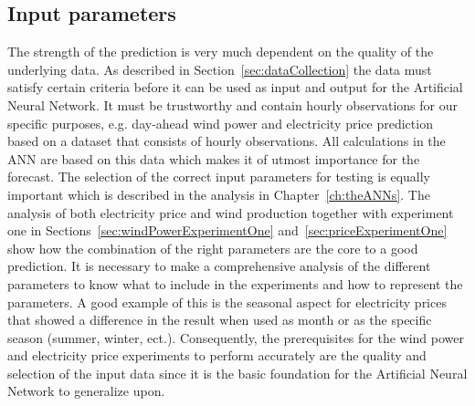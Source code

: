 \subsection{Input parameters}
The strength of the prediction is very much dependent on the quality of the underlying data. As described in Section~\ref{sec:dataCollection} the data must satisfy certain criteria before it can be used as input and output for the Artificial Neural Network. It must be trustworthy and contain hourly observations for our specific purposes, e.g. day-ahead wind power and electricity price prediction based on a dataset that consists of hourly observations. All calculations in the ANN are based on this data which makes it of utmost importance for the forecast. The selection of the correct input parameters for testing is equally important which is described in the analysis in Chapter~\ref{ch:theANNs}. The analysis of both electricity price and wind production together with experiment one in Sections~\ref{sec:windPowerExperimentOne} and~\ref{sec:priceExperimentOne} show how the combination of the right parameters are the core to a good prediction. It is necessary to make a comprehensive analysis of the different parameters to know what to include in the experiments and how to represent the parameters. A good example of this is the seasonal aspect for electricity prices that showed a difference in the result when used as month or as the specific season (summer, winter, ect.). Consequently, the prerequisites for the wind power and electricity price experiments to perform accurately are the quality and selection of the input data since it is the basic foundation for the Artificial Neural Network to generalize upon.

